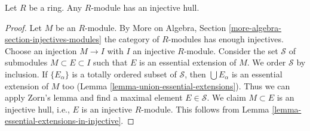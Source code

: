 \begin{lemma}
\label{lemma-injective-hull}
Let $R$ be a ring. Any $R$-module has an injective hull.
\end{lemma}

\begin{proof}
Let $M$ be an $R$-module. By
More on Algebra, Section \ref{more-algebra-section-injectives-modules}
the category of $R$-modules has enough injectives.
Choose an injection $M \to I$ with $I$ an injective $R$-module.
Consider the set $\mathcal{S}$ of submodules $M \subset E \subset I$
such that $E$ is an essential extension of $M$. We order $\mathcal{S}$
by inclusion. If $\{E_\alpha\}$ is a totally ordered subset
of $\mathcal{S}$, then $\bigcup E_\alpha$ is an essential extension of $M$
too (Lemma \ref{lemma-union-essential-extensions}).
Thus we can apply Zorn's lemma and find a maximal element
$E \in \mathcal{S}$. We claim $M \subset E$ is an injective hull, i.e.,
$E$ is an injective $R$-module. This follows from
Lemma \ref{lemma-essential-extensions-in-injective}.
\end{proof}

